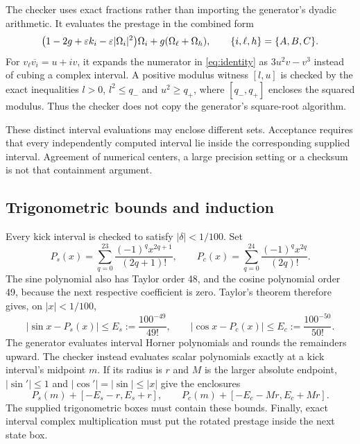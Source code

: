 \documentclass[11pt,a4paper]{article}
\numberwithin{equation}{section}
\theoremstyle{remark}\newtheorem{remark}[theorem]{Remark}
\begin{document}
The checker uses exact fractions rather than importing the generator's dyadic arithmetic. It evaluates the prestage in the combined form
\begin{equation}
\bigl(1-2g+\varepsilon k_i-\varepsilon|\Omega_i|^2\bigr)\Omega_i
 +g(\Omega_\ell+\Omega_h),\qquad\{i,\ell,h\}=\{A,B,C\}.
\label{eq:combined}
\end{equation}
For $v_\ell\overline{v_i}=u+iv$, it expands the numerator in \eqref{eq:identity} as $3u^2v-v^3$ instead of cubing a complex interval. A positive modulus witness $[l,u]$ is checked by the exact inequalities $l>0$, $l^2\le q_-$ and $u^2\ge q_+$, where $[q_-,q_+]$ encloses the squared modulus. Thus the checker does not copy the generator's square-root algorithm.

These distinct interval evaluations may enclose different sets. Acceptance requires that every independently computed interval lie inside the corresponding supplied interval. Agreement of numerical centers, a large precision setting or a checksum is not that containment argument.

\clearpage
\subsection{Trigonometric bounds and induction}\label{sec:taylor}
Every kick interval is checked to satisfy $|\delta|<1/100$. Set
\begin{equation}
P_s(x)=\sum_{q=0}^{23}\frac{(-1)^q x^{2q+1}}{(2q+1)!},\qquad
P_c(x)=\sum_{q=0}^{24}\frac{(-1)^q x^{2q}}{(2q)!}.
\label{eq:polynomials}
\end{equation}
The sine polynomial also has Taylor order 48, and the cosine polynomial order 49, because the next respective coefficient is zero. Taylor's theorem therefore gives, on $|x|<1/100$,
\begin{equation}
|\sin x-P_s(x)|\le E_s:=\frac{100^{-49}}{49!},\qquad
|\cos x-P_c(x)|\le E_c:=\frac{100^{-50}}{50!}.
\label{eq:remainders}
\end{equation}
The generator evaluates interval Horner polynomials and rounds the remainders upward. The checker instead evaluates scalar polynomials exactly at a kick interval's midpoint $m$. If its radius is $r$ and $M$ is the larger absolute endpoint, $|\sin'|\le1$ and $|\cos'|=|\sin|\le|x|$ give the enclosures
\begin{equation}
P_s(m)+[-E_s-r,E_s+r],\qquad
P_c(m)+[-E_c-Mr,E_c+Mr].\label{eq:midpoint}
\end{equation}
The supplied trigonometric boxes must contain these bounds. Finally, exact interval complex multiplication must put the rotated prestage inside the next state box.
\end{document}
